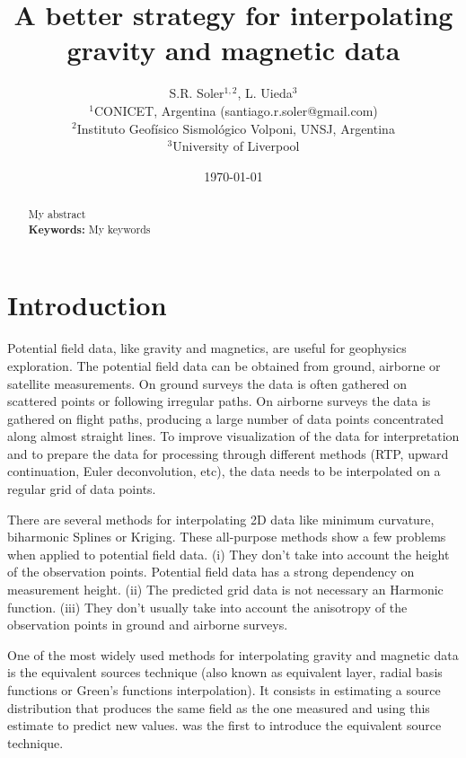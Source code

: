 \documentclass[twocolumn]{article}
\makeatletter
\newcommand{\Title}{A better strategy for interpolating gravity and magnetic data}
\newcommand{\AuthorAffil}{
    {\large
        S.R. Soler$^{1,2}$,
        L. Uieda$^{3}$
    }
    \\[0.4cm]
    {\small $^{1}$CONICET, Argentina (santiago.r.soler@gmail.com)} \\
    {\small $^{2}$Instituto Geofísico Sismológico Volponi, UNSJ, Argentina} \\
    {\small $^{3}$University of Liverpool} \\

}
\makeatother
\begin{document}
\title{\Title}
\author{\AuthorAffil}
\date{
    \normalsize
    \today
}
\maketitle

\begin{abstract}
    My abstract
    \\[0.5cm]
    \textbf{Keywords:}
    My keywords
\end{abstract}


\section{Introduction}

Potential field data, like gravity and magnetics, are useful for geophysics exploration.
The potential field data can be obtained from ground, airborne or satellite
measurements.
On ground surveys the data is often gathered on scattered points or following irregular
paths.
On airborne surveys the data is gathered on flight paths, producing a large number of
data points concentrated along almost straight lines.
To improve visualization of the data for interpretation and to prepare the data for
processing through different methods (RTP, upward continuation, Euler deconvolution,
etc), the data needs to be interpolated on a regular grid of data points.

There are several methods for interpolating 2D data like minimum curvature, biharmonic
Splines or Kriging.
These all-purpose methods show a few problems when applied to potential field data.
(i) They don't take into account the height of the observation points. Potential field
data has a strong dependency on measurement height.
(ii) The predicted grid data is not necessary an Harmonic function.
(iii) They don't usually take into account the anisotropy of the observation points in
ground and airborne surveys.

One of the most widely used methods for interpolating gravity and magnetic data is the
equivalent sources technique (also known as equivalent layer, radial basis functions or
Green's functions interpolation).
It consists in estimating a source distribution that produces the same field as the one
measured and using this estimate to predict new values.
\citet{dampney1969} was the first to introduce the equivalent source technique.
\end{document}
